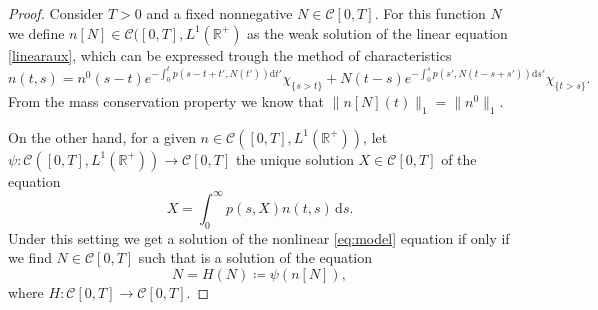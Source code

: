 \documentclass[11pt,a4paper]{article}
\newcommand{\R}{\mathbb{R}}
\newcommand{\dd}{\mathrm{d}}
\begin{document}
\begin{proof}
    Consider $T>0$ and a fixed nonnegative $N\in\mathcal{C}[0,T]$. For this function $N$ we define $n[N]\in\mathcal{C}([0,T],L^1(\R^+)$ as the weak solution of the linear equation \eqref{linearaux},
    which can be expressed trough the method of characteristics
    \begin{equation*}
    n(t,s)=n^0(s-t)e^{-\int_0^t p(s-t+t',N(t'))\dd t'}\chi_{\{s>t\}}+N(t-s)e^{-\int_0^s p(s',N(t-s+s'))\dd s'}\chi_{\{t>s\}}.
    \end{equation*}
    From the mass conservation property we know that $\|n[N](t)\|_1=\|n^0\|_1$.
    
    On the other hand, for a given $n\in\mathcal{C}([0,T],L^1(\R^+))$, let $\psi\colon \mathcal{C}([0,T],L^1(\R^+))\to\mathcal{C}[0,T]$ the unique solution $X\in\mathcal{C}[0,T]$ of the equation
       \begin{equation*}
    X=\int_0^\infty p(s,X)n(t,s)\,\dd s.
   \end{equation*}
    Under this setting we get a solution of the nonlinear \eqref{eq:model} equation if only if we find $N\in\mathcal{C}[0,T]$ such that is a solution of the equation
      \begin{equation*}
N=H(N)\coloneqq\psi\left(n[N]\right),
\end{equation*}
    where $H\colon\mathcal{C}[0,T]\to\mathcal{C}[0,T]$.
    

\end{proof}
\end{document}
